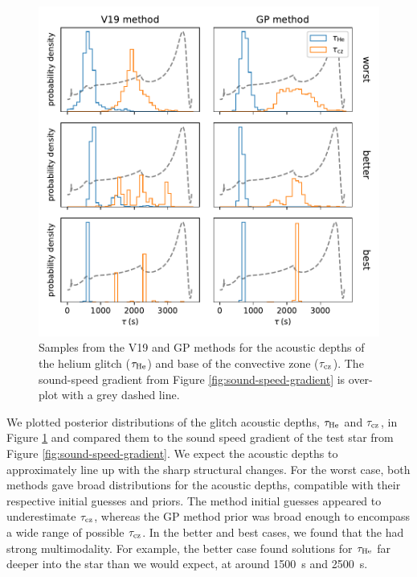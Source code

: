 \begin{figure}[!tbp]
    \centering
    \includegraphics{figures/glitch-test-tau.pdf}
    \caption{Samples from the V19 and GP methods for the acoustic depths of the helium glitch (\(\tau_{{\mathrm{He}}}\)) and base of the convective zone (\(\tau_{{\mathrm{cz}}}\)). The sound-speed gradient from Figure \ref{fig:sound-speed-gradient} is over-plot with a grey dashed line.}
    \label{fig:glitch-test-tau}
\end{figure}

We plotted posterior distributions of the glitch acoustic depths, \(\tau_{{\mathrm{He}}}\) and \(\tau_{{\mathrm{cz}}}\), in Figure \ref{fig:glitch-test-tau} and compared them to the sound speed gradient of the test star from Figure \ref{fig:sound-speed-gradient}. We expect the acoustic depths to approximately line up with the sharp structural changes. For the worst case, both methods gave broad distributions for the acoustic depths, compatible with their respective initial guesses and priors. The  method initial guesses appeared to underestimate \(\tau_{{\mathrm{cz}}}\), whereas the GP method prior was broad enough to encompass a wide range of possible \(\tau_{{\mathrm{cz}}}\). In the better and best cases, we found that the  had strong multimodality. For example, the better case found solutions for \(\tau_{{\mathrm{He}}}\) far deeper into the star than we would expect, at around \SI{1500}{\second} and \SI{2500}{\second}.

